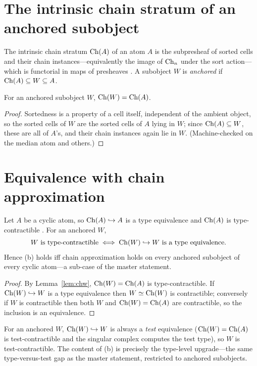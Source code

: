 
\section{The intrinsic chain stratum of an anchored subobject}

The intrinsic chain stratum $\operatorname{Ch}(A)$ of an atom $A$ is the subpresheaf of
sorted cells and their chain instances---equivalently the image of
$\operatorname{Ch}_n$ under the sort action---which is functorial in maps of presheaves
\cite{PaperW}.  A subobject $W$ is \emph{anchored} if $\operatorname{Ch}(A)\subseteq
W\subseteq A$.

\begin{lem}\label{lem:chw}
  For an anchored subobject $W$, $\operatorname{Ch}(W)=\operatorname{Ch}(A)$.
\end{lem}
\begin{proof}
  Sortedness is a property of a cell itself, independent of the ambient
  object, so the sorted cells of $W$ are the sorted cells of $A$ lying in
  $W$; since $\operatorname{Ch}(A)\subseteq W$, these are all of $A$'s, and their chain
  instances again lie in $W$.  (Machine-checked on the median atom and
  others.)
\end{proof}

\section{Equivalence with chain approximation}

\begin{prop}\label{prop:bequiv}
  Let $A$ be a cyclic atom, so $\operatorname{Ch}(A)\hookrightarrow A$ is a type
  equivalence and $\operatorname{Ch}(A)$ is type-contractible \cite{PaperW}.  For an
  anchored $W$,
  \[
    W\text{ is type-contractible}\iff\operatorname{Ch}(W)\hookrightarrow W\text{ is a
    type equivalence.}
  \]
  Hence \textup{(b)} holds iff chain approximation holds on every
  anchored subobject of every cyclic atom---a sub-case of the master
  statement.
\end{prop}
\begin{proof}
  By Lemma~\ref{lem:chw}, $\operatorname{Ch}(W)=\operatorname{Ch}(A)$ is type-contractible.  If
  $\operatorname{Ch}(W)\hookrightarrow W$ is a type equivalence then $W\simeq\operatorname{Ch}(W)$ is
  contractible; conversely if $W$ is contractible then both $W$ and
  $\operatorname{Ch}(W)=\operatorname{Ch}(A)$ are contractible, so the inclusion is an equivalence.
\end{proof}

\begin{cor}
  For an anchored $W$, $\operatorname{Ch}(W)\hookrightarrow W$ is always a \emph{test}
  equivalence ($\operatorname{Ch}(W)=\operatorname{Ch}(A)$ is test-contractible and the singular
  complex computes the test type), so $W$ is test-contractible.  The
  content of \textup{(b)} is precisely the type-level upgrade---the same
  type-versus-test gap as the master statement, restricted to anchored
  subobjects.
\end{cor}

